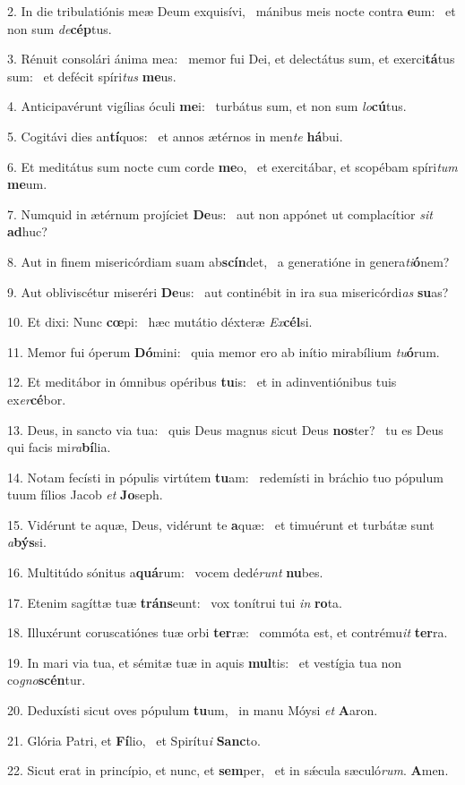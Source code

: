 2. In die tribulatiónis meæ Deum exquisívi, \dag\  mánibus meis nocte contra \textbf{e}um: \ast\  et non sum \textit{de}\textbf{cép}tus.\

3. Rénuit consolári ánima mea: \dag\  memor fui Dei, et delectátus sum, et exerci\textbf{tá}tus sum: \ast\  et defécit spíri\textit{tus} \textbf{me}us.\

4. Anticipavérunt vigílias óculi \textbf{me}i: \ast\  turbátus sum, et non sum \textit{lo}\textbf{cú}tus.\

5. Cogitávi dies an\textbf{tí}quos: \ast\  et annos ætérnos in men\textit{te} \textbf{há}bui.\

6. Et meditátus sum nocte cum corde \textbf{me}o, \ast\  et exercitábar, et scopébam spíri\textit{tum} \textbf{me}um.\

7. Numquid in ætérnum projíciet \textbf{De}us: \ast\  aut non appónet ut complacítior \textit{sit} \textbf{ad}huc?\

8. Aut in finem misericórdiam suam ab\textbf{scín}det, \ast\  a generatióne in genera\textit{ti}\textbf{ó}nem?\

9. Aut obliviscétur miseréri \textbf{De}us: \ast\  aut continébit in ira sua misericórdi\textit{as} \textbf{su}as?\

10. Et dixi: Nunc \textbf{cœ}pi: \ast\  hæc mutátio déxteræ \textit{Ex}\textbf{cél}si.\

11. Memor fui óperum \textbf{Dó}mini: \ast\  quia memor ero ab inítio mirabílium \textit{tu}\textbf{ó}rum.\

12. Et meditábor in ómnibus opéribus \textbf{tu}is: \ast\  et in adinventiónibus tuis ex\textit{er}\textbf{cé}bor.\

13. Deus, in sancto via tua: \dag\  quis Deus magnus sicut Deus \textbf{nos}ter? \ast\  tu es Deus qui facis mi\textit{ra}\textbf{bí}lia.\

14. Notam fecísti in pópulis virtútem \textbf{tu}am: \ast\  redemísti in bráchio tuo pópulum tuum fílios Jacob \textit{et} \textbf{Jo}seph.\

15. Vidérunt te aquæ, Deus, vidérunt te \textbf{a}quæ: \ast\  et timuérunt et turbátæ sunt \textit{a}\textbf{býs}si.\

16. Multitúdo sónitus a\textbf{quá}rum: \ast\  vocem dedé\textit{runt} \textbf{nu}bes.\

17. Etenim sagíttæ tuæ \textbf{tráns}eunt: \ast\  vox tonítrui tui \textit{in} \textbf{ro}ta.\

18. Illuxérunt coruscatiónes tuæ orbi \textbf{ter}ræ: \ast\  commóta est, et contrému\textit{it} \textbf{ter}ra.\

19. In mari via tua, et sémitæ tuæ in aquis \textbf{mul}tis: \ast\  et vestígia tua non co\textit{gno}\textbf{scén}tur.\

20. Deduxísti sicut oves pópulum \textbf{tu}um, \ast\  in manu Móysi \textit{et} \textbf{A}aron.\

21. Glória Patri, et \textbf{Fí}lio, \ast\  et Spirítu\textit{i} \textbf{Sanc}to.\

22. Sicut erat in princípio, et nunc, et \textbf{sem}per, \ast\  et in sǽcula sæculó\textit{rum}. \textbf{A}men.\

